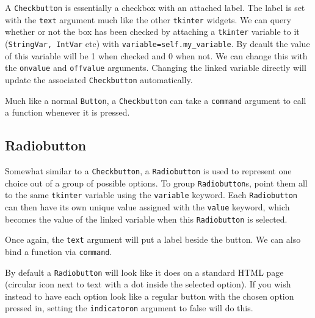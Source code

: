 \documentclass[a4paper,11pt,openany]{book}
\begin{document}
A \lstinline[columns=fixed]{Checkbutton} is essentially a checkbox with an attached label. The label is set with the \lstinline[columns=fixed]{text} argument much like the other \lstinline[columns=fixed]{tkinter} widgets. We can query whether or not the box has been checked by attaching a \lstinline[columns=fixed]{tkinter} variable to it (\lstinline[columns=fixed]{StringVar, IntVar} etc) with \lstinline[columns=fixed]{variable=self.my_variable}. By deault the value of this variable will be 1 when checked and 0 when not. We can change this with the \lstinline[columns=fixed]{onvalue} and \lstinline[columns=fixed]{offvalue} arguments. Changing the linked variable directly will update the associated \lstinline[columns=fixed]{Checkbutton} automatically. 

\vspace{5mm}

Much like a normal \lstinline[columns=fixed]{Button}, a \lstinline[columns=fixed]{Checkbutton} can take a \lstinline[columns=fixed]{command} argument to call a function whenever it is pressed.

\subsection{Radiobutton} 

Somewhat similar to a \lstinline[columns=fixed]{Checkbutton}, a \lstinline[columns=fixed]{Radiobutton} is used to represent one choice out of a group of possible options. To group \lstinline[columns=fixed]{Radiobutton}s, point them all to the same \lstinline[columns=fixed]{tkinter} variable using the \lstinline[columns=fixed]{variable} keyword. Each \lstinline[columns=fixed]{Radiobutton} can then have its own unique value assigned with the \lstinline[columns=fixed]{value} keyword, which becomes the value of the linked variable when this \lstinline[columns=fixed]{Radiobutton} is selected. 

\vspace{5mm}

Once again, the \lstinline[columns=fixed]{text} argument will put a label beside the button. We can also bind a function via \lstinline[columns=fixed]{command}.

\vspace{5mm}

By default a \lstinline[columns=fixed]{Radiobutton} will look like it does on a standard HTML page (circular icon next to text with a dot inside the selected option). If you wish instead to have each option look like a regular button with the chosen option pressed in, setting the \lstinline[columns=fixed]{indicatoron} argument to false will do this. 
\end{document}
